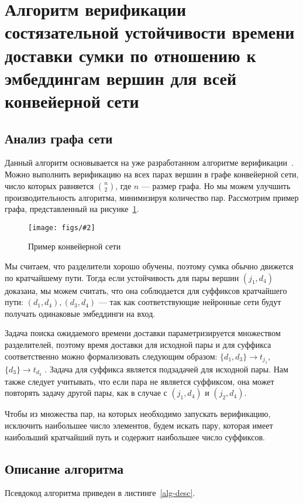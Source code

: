 \documentclass[a4paper]{article}
\newcommand{\fig}[3][1]{
    \begin{figure}[H]
        \centering
        \texttt{[image: figs/\#2]}
        \caption{#3}\label{#2}
    \end{figure}
}
\begin{document}
\section{Алгоритм верификации состязательной устойчивости времени доставки
сумки по отношению к эмбеддингам вершин для всей конвейерной сети}

\subsection{Анализ графа сети}

Данный алгоритм основывается на уже разработанном алгоритме
верификации~\cite{base-alg}. Можно выполнить верификацию на всех парах вершин
в графе конвейерной сети, число которых равняется $n \choose 2$, где $n$ ---
размер графа. Но мы можем улучшить производительность алгоритма, минимизируя
количество пар. Рассмотрим пример графа, представленный на
рисунке~\ref{example-graph}.


\fig[.25]{example-graph}{Пример конвейерной сети}

Мы считаем, что разделители хорошо обучены, поэтому сумка обычно движется по
кратчайшему пути. Тогда если устойчивость для пары вершин $(j_1, d_4)$
доказана, мы можем считать, что она соблюдается для суффиксов кратчайшего пути:
$(d_1, d_4), (d_3, d_4)$ --- так как соответствующие нейронные сети будут
получать одинаковые эмбеддинги на вход.

Задача поиска ожидаемого времени доставки параметризируется множеством
разделителей, поэтому время доставки для исходной пары и для суффикса
соответственно можно формализовать следующим образом: $\{ d_1, d_3 \} \to
t_{j_1} $, $\{d_3\} \to t_{d_3}$ . Задача для суффикса является подзадачей
для исходной пары. Нам также следует учитывать, что если пара не является
суффиксом, она может повторять задачу другой пары, как в случае с $(j_1, d_4)$
и $(j_2, d_4)$.

Чтобы из множества пар, на которых необходимо запускать верификацию, исключить
наибольшее число элементов, будем искать пару, которая имеет наибольший
кратчайший путь и содержит наибольшее число суффиксов.

\subsection{Описание алгоритма}

Псевдокод алгоритма приведен в листинге~\ref{alg-desc}.
\end{document}
